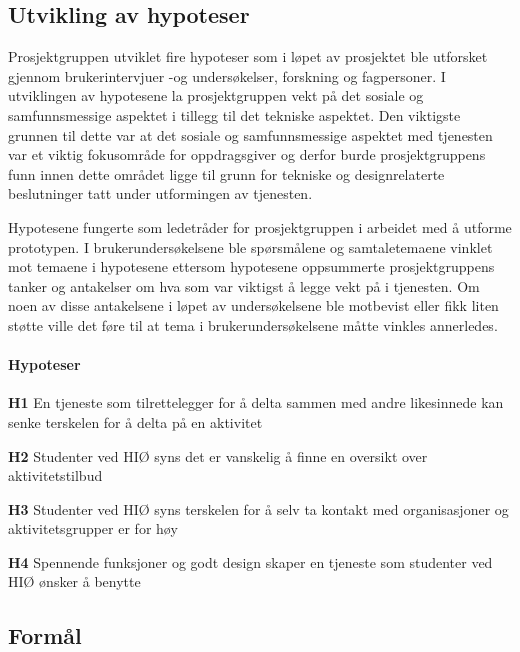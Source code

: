 \subsection{Utvikling av hypoteser}
\label{section:hypoteser}
Prosjektgruppen utviklet fire hypoteser som i løpet av prosjektet ble utforsket gjennom brukerintervjuer -og undersøkelser, forskning og fagpersoner. I utviklingen av hypotesene la prosjektgruppen vekt på det sosiale og samfunnsmessige aspektet i tillegg til det tekniske aspektet. Den viktigste grunnen til dette var at det sosiale og samfunnsmessige aspektet med tjenesten var et viktig fokusområde for oppdragsgiver og derfor burde prosjektgruppens funn innen dette området ligge til grunn for tekniske og designrelaterte beslutninger tatt under utformingen av tjenesten.

Hypotesene fungerte som ledetråder for prosjektgruppen i arbeidet med å utforme prototypen. I brukerundersøkelsene ble spørsmålene og samtaletemaene vinklet mot temaene i hypotesene ettersom hypotesene oppsummerte prosjektgruppens tanker og antakelser om hva som var viktigst å legge vekt på i tjenesten. Om noen av disse antakelsene i løpet av undersøkelsene ble motbevist eller fikk liten støtte ville det føre til at tema i brukerundersøkelsene måtte vinkles annerledes.

\paragraph{Hypoteser}
\begin{compactitem}
\item[{\bf H1}] En tjeneste som tilrettelegger for å delta sammen med andre likesinnede kan senke terskelen for å delta på en aktivitet
\item[{\bf H2}] Studenter ved HIØ syns det er vanskelig å finne en oversikt over aktivitetstilbud
\item[{\bf H3}] Studenter ved HIØ syns terskelen for å selv ta kontakt med organisasjoner og aktivitetsgrupper er for høy 
\item[{\bf H4}] Spennende funksjoner og godt design skaper en tjeneste som studenter ved HIØ ønsker å benytte
\end{compactitem}

\subsection{Formål}
\label{sec:maal-metode-resultater}

